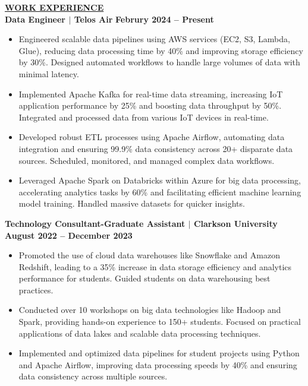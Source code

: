 \documentclass{article}
\begin{document}
\noindent \textbf{\underline{WORK EXPERIENCE}} \\
\noindent \textbf{Data Engineer $\mid$ Telos Air} \hfill \textbf{Februry 2024 – Present}
\begin{itemize}[noitemsep,nolistsep,leftmargin=*]
\item {\small Engineered scalable data pipelines using AWS services (EC2, S3, Lambda, Glue), reducing data processing time by 40\% and improving storage efficiency by 30\%. Designed automated workflows to handle large volumes of data with minimal latency.}
\item {\small Implemented Apache Kafka for real-time data streaming, increasing IoT application performance by 25\% and boosting data throughput by 50\%. Integrated and processed data from various IoT devices in real-time.}
\item {\small Developed robust ETL processes using Apache Airflow, automating data integration and ensuring 99.9\% data consistency across 20+ disparate data sources. Scheduled, monitored, and managed complex data workflows.}
\item {\small Leveraged Apache Spark on Databricks within Azure for big data processing, accelerating analytics tasks by 60\% and facilitating efficient machine learning model training. Handled massive datasets for quicker insights.}
\end{itemize}
\vspace{1mm}

\noindent \textbf{Technology Consultant-Graduate Assistant $\mid$ Clarkson University} \hfill \textbf{August 2022 – December 2023}
\begin{itemize}[noitemsep,nolistsep,leftmargin=*]
\item {\small Promoted the use of cloud data warehouses like Snowflake and Amazon Redshift, leading to a 35\% increase in data storage efficiency and analytics performance for students. Guided students on data warehousing best practices.}
\item {\small Conducted over 10 workshops on big data technologies like Hadoop and Spark, providing hands-on experience to 150+ students. Focused on practical applications of data lakes and scalable data processing techniques.}
\item {\small Implemented and optimized data pipelines for student projects using Python and Apache Airflow, improving data processing speeds by 40\% and ensuring data consistency across multiple sources.}
\end{itemize}
\vspace{1mm}
\end{document}
